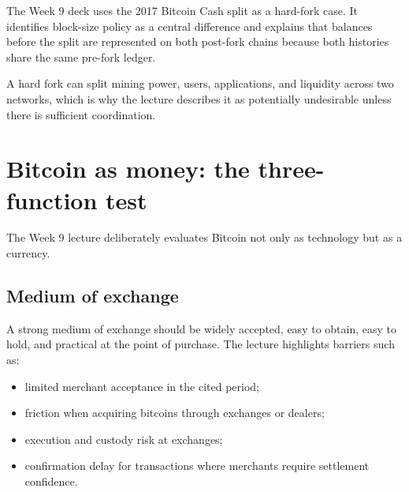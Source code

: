 The Week 9 deck uses the 2017 Bitcoin Cash split as a hard-fork case. It identifies block-size policy as a central difference and explains that balances before the split are represented on both post-fork chains because both histories share the same pre-fork ledger.

\begin{mlfigure}
\end{mlfigure}

A hard fork can split mining power, users, applications, and liquidity across two networks, which is why the lecture describes it as potentially undesirable unless there is sufficient coordination.

\section{Bitcoin as money: the three-function test}

The Week 9 lecture deliberately evaluates Bitcoin not only as technology but as a currency.

\subsection{Medium of exchange}

A strong medium of exchange should be widely accepted, easy to obtain, easy to hold, and practical at the point of purchase. The lecture highlights barriers such as:

\begin{itemize}
  \item limited merchant acceptance in the cited period;
  \item friction when acquiring bitcoins through exchanges or dealers;
  \item execution and custody risk at exchanges;
  \item confirmation delay for transactions where merchants require settlement confidence.
\end{itemize}

